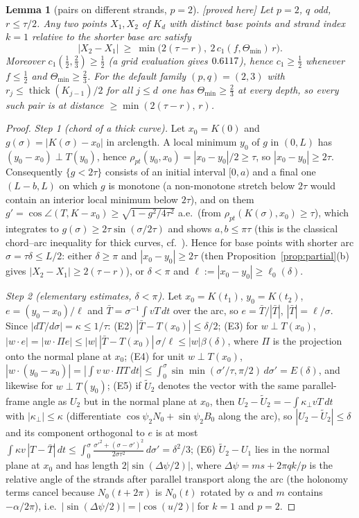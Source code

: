 \documentclass[10pt,a4paper]{article}
\theoremstyle{plain}
\newtheorem{lemma}[theorem]{Lemma}
\theoremstyle{definition}
\theoremstyle{remark}
\newcommand{\thick}{\operatorname{thick}}
\newcommand{\status}[1]{\textsf{\small [#1]}}
\begin{document}
\begin{lemma}[pairs on different strands, $p=2$]\label{lem:Hc1}\status{proved here}
Let $p=2$, $q$ odd, $r\le\tau/2$. Any two points $X_1,X_2$ of $K_d$ with distinct base points and strand index $k=1$ relative to the shorter base arc satisfy
\[
|X_2-X_1|\ \ge\ \min\bigl(2(\tau-r),\ 2\,c_1(f,\Theta_{\min})\,r\bigr).
\]
Moreover $c_1(\tfrac12,\tfrac23)\ge\tfrac12$ (a grid evaluation gives $0.6117$), hence $c_1\ge\tfrac12$ whenever $f\le\frac12$ and $\Theta_{\min}\ge\frac23$. For the default family $(p,q)=(2,3)$ with $r_j\le\thick(K_{j-1})/2$ for all $j\le d$ one has $\Theta_{\min}\ge\tfrac23$ at every depth, so every such pair is at distance $\ge\min(2(\tau-r),\,r)$.
\end{lemma}
\begin{proof}
\emph{Step 1 (chord of a thick curve).} Let $x_0=K(0)$ and $g(\sigma)=|K(\sigma)-x_0|$ in arclength. A local minimum $y_0$ of $g$ in $(0,L)$ has $(y_0-x_0)\perp T(y_0)$, hence $\rho_{pt}(y_0,x_0)=|x_0-y_0|/2\ge\tau$, so $|x_0-y_0|\ge2\tau$. Consequently $\{g<2\tau\}$ consists of an initial interval $[0,a)$ and a final one $(L-b,L)$ on which $g$ is monotone (a non-monotone stretch below $2\tau$ would contain an interior local minimum below $2\tau$), and on them $g'=\cos\angle(T,K-x_0)\ge\sqrt{1-g^2/4\tau^2}$ a.e.\ (from $\rho_{pt}(K(\sigma),x_0)\ge\tau$), which integrates to $g(\sigma)\ge2\tau\sin(\sigma/2\tau)$ and shows $a,b\le\pi\tau$ (this is the classical chord--arc inequality for thick curves, cf.\ \cite{GonzalezMaddocks1999,CKS2002}). Hence for base points with shorter arc $\sigma=\tau\delta\le L/2$: either $\delta\ge\pi$ and $|x_0-y_0|\ge2\tau$ (then Proposition~\ref{prop:partial}(b) gives $|X_2-X_1|\ge2(\tau-r)$), or $\delta<\pi$ and $\ell:=|x_0-y_0|\ge\ell_0(\delta)$.

\emph{Step 2 (elementary estimates, $\delta<\pi$).} Let $x_0=K(t_1)$, $y_0=K(t_2)$, $e=(y_0-x_0)/\ell$ and $\bar T=\sigma^{-1}\int vT\,dt$ over the arc, so $e=\bar T/|\bar T|$, $|\bar T|=\ell/\sigma$. Since $|dT/d\sigma|=\kappa\le1/\tau$: (E2) $|\bar T-T(x_0)|\le\delta/2$; (E3) for $w\perp T(x_0)$, $|w\cdot e|=|w\cdot\Pi e|\le|w|\,|\bar T-T(x_0)|\,\sigma/\ell\le|w|\beta(\delta)$, where $\Pi$ is the projection onto the normal plane at $x_0$; (E4) for unit $w\perp T(x_0)$, $|w\cdot(y_0-x_0)|=|\int v\,w\cdot\Pi T\,dt|\le\int_0^\sigma\sin\min(\sigma'/\tau,\pi/2)\,d\sigma'=E(\delta)$, and likewise for $w\perp T(y_0)$; (E5) if $\tilde U_2$ denotes the vector with the same parallel-frame angle as $U_2$ but in the normal plane at $x_0$, then $U_2-\tilde U_2=-\int\kappa_\perp vT\,dt$ with $|\kappa_\perp|\le\kappa$ (differentiate $\cos\psi_2N_0+\sin\psi_2B_0$ along the arc), so $|U_2-\tilde U_2|\le\delta$ and its component orthogonal to $e$ is at most $\int\kappa v\,|T-\bar T|\,dt\le\int_0^\sigma\frac{\sigma'^2+(\sigma-\sigma')^2}{2\sigma\tau^2}\,d\sigma'=\delta^2/3$; (E6) $\tilde U_2-U_1$ lies in the normal plane at $x_0$ and has length $2|\sin(\Delta\psi/2)|$, where $\Delta\psi=ms+2\pi qk/p$ is the relative angle of the strands after parallel transport along the arc (the holonomy terms cancel because $N_0(t+2\pi)$ is $N_0(t)$ rotated by $\alpha$ and $m$ contains $-\alpha/2\pi$), i.e.\ $|\sin(\Delta\psi/2)|=|\cos(u/2)|$ for $k=1$ and $p=2$.


\end{proof}
\end{document}
